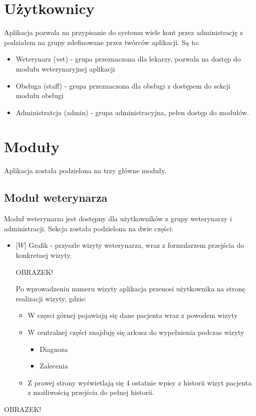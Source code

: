 \documentclass[10pt,a4paper]{article}
\begin{document}
	
	
	
	
	\section {Użytkownicy}
		Aplikacja pozwala na przypisanie do systemu wiele kont przez administrację z podziałem na grupy zdefinowane przez twórców aplikacji. Są to:
		\begin{itemize}
			\item Weterynarz (vet) - grupa przeznaczona dla lekarzy, pozwala na dostęp do modułu weterynaryjnej aplikacji
			\item Obsługa (staff) - grupa przeznaczona dla obsługi z dostępem do sekcji modułu obsługi
			\item Administratcja (admin) - grupa administracyjna, pełen dostęp do modułów. 
		\end{itemize}
	
	\section{Moduły}
	Aplikacja została podzielona na trzy główne moduły. 
	\subsection{Moduł weterynarza}
	Moduł weterynarza jest dostępny dla użytkowników z grupy weterynarzy i administracji. Sekcja została podzielona na dwie części:
	\begin{itemize}
		\item $[W$] Grafik - przyszłe wizyty weterynarza, wraz z formularzem przejścia do konkretnej wizyty. 
		
		OBRAZEK!
		
		Po wprowadzeniu numeru wizyty aplikacja przenosi użytkownika na stronę realizacji wizyty, gdzie:
			\begin{itemize}
				\item W częsci górnej pojawiają się dane pacjenta wraz z powodem wizyty
				\item W centralnej części znajduję się arkusz do wypełnienia podczas wizyty
					\begin{itemize}
						\item Diagnoza
						\item Zalecenia
					\end{itemize}
				\item Z prawej strony wyświetlają się 4 ostatnie wpisy z historii wizyt pacjenta z możliwością przejścia do pełnej historii.
			
			\end{itemize}
		\end{itemize}
		OBRAZEK!
		
\end{document}
